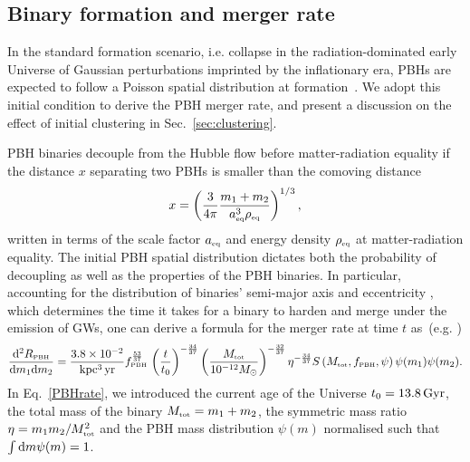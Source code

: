 \documentclass[11pt,a4paper]{article}
\renewcommand{\d}{{\rm d}}
\newcommand{\lp }{\left (}
\newcommand{\rp }{\right )}
\newcommand{\PBH}{\text{\tiny PBH}}
\begin{document}
\subsection{Binary formation and merger rate}
\label{sec:MergerRate}

In the standard formation scenario, i.e. collapse in the radiation-dominated early Universe of Gaussian perturbations imprinted by the inflationary era, PBHs are expected to follow a Poisson spatial distribution at formation~\cite{Ali-Haimoud:2018dau,Desjacques:2018wuu,Ballesteros:2018swv,MoradinezhadDizgah:2019wjf,Inman:2019wvr}. 
We adopt this initial condition to derive the PBH merger rate, and present a discussion on the effect of initial clustering in Sec.~\ref{sec:clustering}.

PBH binaries decouple from the Hubble flow before matter-radiation equality if the distance $x$
separating two PBHs is smaller than the comoving distance~\cite{Nakamura:1997sm, Ioka:1998nz}
\begin{equation}
{x} = \lp \frac{3}{4\pi} \frac{m_1+m_2}{a_\text{\tiny eq}^3\rho_\text{\tiny eq}} \rp^{1/3},
\end{equation}
written in terms of the scale factor $a_\text{\tiny eq}$ and energy density $\rho_\text{\tiny eq}$ at matter-radiation equality.
The initial PBH spatial distribution dictates both the probability of decoupling as well as the properties of the PBH binaries. In particular, accounting for the distribution of binaries' semi-major axis and eccentricity \cite{Ali-Haimoud:2017rtz,Kavanagh:2018ggo,Liu:2018ess,Franciolini:2021xbq}, which determines the time it takes for a binary to harden and merge under the emission of GWs, one can derive a formula for the merger rate at time $t$ as~(e.g. \cite{Ali-Haimoud:2017rtz,Raidal:2018bbj}) 
\begin{align}
\frac{\d^2 R_\text{\tiny PBH} }{\d m_1 \d m_2}= 
\frac{3.8  \times 10^{-2}}{\rm kpc^3 \, yr}
f_\PBH^{\frac{53}{37}} \,
\lp \frac{t}{t_0} \rp^{-\frac{34}{37}}   
 \lp \frac{M_\text{\tiny tot}}{10^{-12}M_\odot} \rp^{-\frac{32}{37}}  
 \eta^{-\frac{34}{37}} 
S\lp M_\text{\tiny tot}, f_\PBH,\psi  \rp
\psi(m_1) \psi (m_2).
\label{PBHrate}
\end{align}
In Eq.~\eqref{PBHrate}, we introduced the current age of the Universe $t_0 = 13.8\,  {\rm Gyr}$, the
total mass of the binary $M_\text{\tiny tot}= m_1+m_2$, the symmetric mass ratio $\eta=m_1 m_2/M_\text{\tiny tot}^2$ and the PBH mass distribution $\psi (m)$ normalised such that $\int \d m \psi (m) = 1$.
\end{document}
